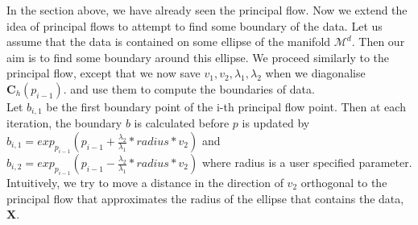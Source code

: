 \documentclass[12pt]{report}
\begin{document}
In the section above, we have already seen the principal flow.
Now we extend the idea of principal flows to attempt to find some boundary of the data.
Let us assume that the data is contained on some ellipse of the manifold
$\mathcal{M}^d$. Then our aim is to find some boundary around this ellipse. We proceed 
similarly to the principal flow, except that 
we now save $v_1, v_2, \lambda_1, \lambda_2$
when we diagonalise $\mathbf{C}_{h}(p_{i-1})$.
and use them to compute the boundaries of data.\\
Let $b_{i,1}$ be the first boundary point of the i-th
principal flow point.
Then at each iteration, the boundary $b$ is calculated before $p$ 
is updated by $b_{i,1} = exp_{p_{i-1}}(p_{i-1} + \frac{\lambda_2}{\lambda_1}*radius*v_2)$ and
$b_{i,2} = exp_{p_{i-1}}(p_{i-1} - \frac{\lambda_2}{\lambda_1}*radius*v_2)$
where radius is a user specified parameter. Intuitively, 
we try to move a distance in the direction of $v_2$ orthogonal to the principal flow
that approximates the radius of the ellipse that contains the data, $\mathbf{X}$.
\end{document}
